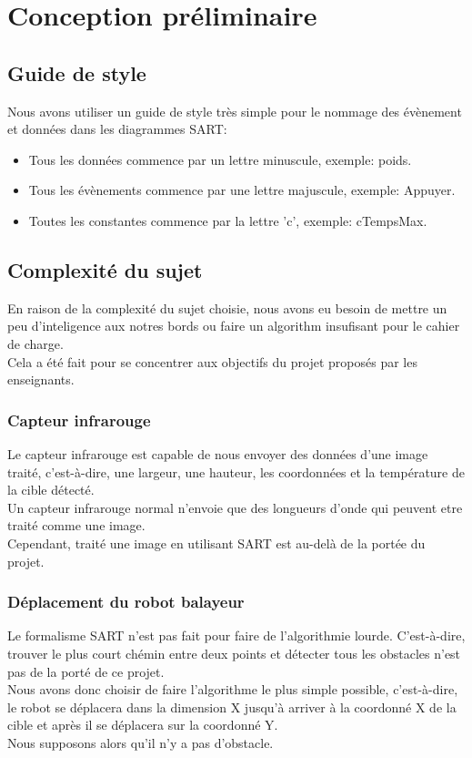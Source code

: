 
\section{Conception préliminaire}

\subsection{Guide de style}
Nous avons utiliser un guide de style très simple pour le nommage des évènement et données dans les diagrammes SART:

\begin{itemize}
\item Tous les données commence par un lettre minuscule, exemple: poids.
\item Tous les évènements commence par une lettre majuscule, exemple: Appuyer.
\item Toutes les constantes commence par la lettre 'c', exemple: cTempsMax.
\end{itemize}

\subsection{Complexité du sujet}
En raison de la complexité du sujet choisie, nous avons eu besoin de mettre un peu d'inteligence aux notres bords ou faire un algorithm insufisant pour le cahier de charge. \\
Cela a été fait pour se concentrer aux objectifs du projet proposés par les enseignants.

\subsubsection{Capteur infrarouge}
Le capteur infrarouge est capable de nous envoyer des données d'une image traité, c'est-à-dire, une largeur, une hauteur, les coordonnées et la température de la cible détecté. \\
Un capteur infrarouge normal n'envoie que des longueurs d'onde qui peuvent etre traité comme une image. \\
Cependant, traité une image en utilisant SART est au-delà de la portée du projet.

\subsubsection{Déplacement du robot balayeur}
Le formalisme SART n'est pas fait pour faire de l'algorithmie lourde. C'est-à-dire, trouver le plus court chémin entre deux points et détecter tous les obstacles n'est pas de la porté de ce projet. \\
Nous avons donc choisir de faire l'algorithme le plus simple possible, c'est-à-dire, le robot se déplacera dans la dimension X jusqu'à arriver à la coordonné X de la cible et après il se déplacera sur la coordonné Y. \\
Nous supposons alors qu'il n'y a pas d'obstacle.


\vfill
\pagebreak
